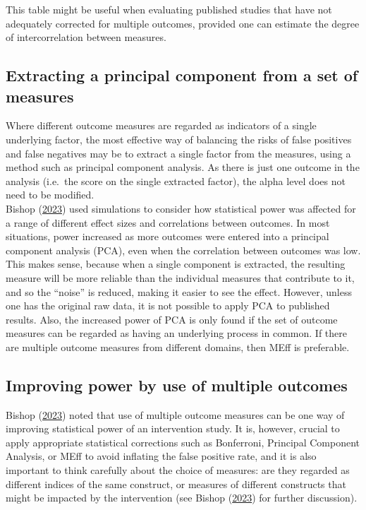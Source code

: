 \documentclass{krantz}
\begin{document}
This table might be useful when evaluating published studies that have not adequately corrected for multiple outcomes, provided one can estimate the degree of intercorrelation between measures.

\hypertarget{extracting-a-principal-component-from-a-set-of-measures}{%
\subsection{Extracting a principal component from a set of measures}\label{extracting-a-principal-component-from-a-set-of-measures}}

Where different outcome measures are regarded as indicators of a single underlying factor, the most effective way of balancing the risks of false positives and false negatives may be to extract a single factor from the measures, using a method such as principal component analysis. As there is just one outcome in the analysis (i.e.~the score on the single extracted factor), the alpha level does not need to be modified.\\
Bishop (\protect\hyperlink{ref-bishop2023b}{2023}) used simulations to consider how statistical power was affected for a range of different effect sizes and correlations between outcomes. In most situations, power increased as more outcomes were entered into a principal component analysis (PCA), even when the correlation between outcomes was low. This makes sense, because when a single component is extracted, the resulting measure will be more reliable than the individual measures that contribute to it, and so the ``noise'' is reduced, making it easier to see the effect. However, unless one has the original raw data, it is not possible to apply PCA to published results. Also, the increased power of PCA is only found if the set of outcome measures can be regarded as having an underlying process in common. If there are multiple outcome measures from different domains, then MEff is preferable.

\hypertarget{improving-power-by-use-of-multiple-outcomes}{%
\subsection{Improving power by use of multiple outcomes}\label{improving-power-by-use-of-multiple-outcomes}}

Bishop (\protect\hyperlink{ref-bishop2023b}{2023}) noted that use of multiple outcome measures can be one way of improving statistical power of an intervention study. It is, however, crucial to apply appropriate statistical corrections such as Bonferroni, Principal Component Analysis, or MEff to avoid inflating the false positive rate, and it is also important to think carefully about the choice of measures: are they regarded as different indices of the same construct, or measures of different constructs that might be impacted by the intervention (see Bishop (\protect\hyperlink{ref-bishop2023b}{2023}) for further discussion).
\end{document}
